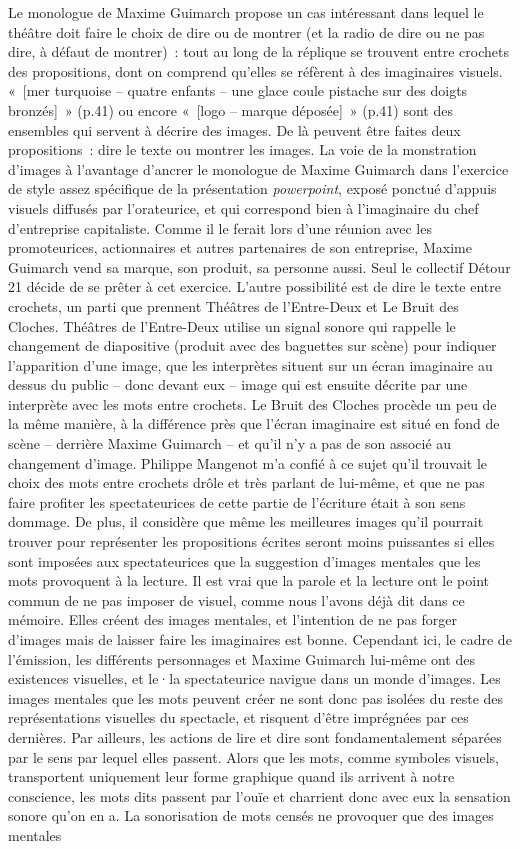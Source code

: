 \documentclass[
]{article}
\begin{document}
Le monologue de Maxime Guimarch propose un cas intéressant dans lequel le théâtre doit faire le choix de dire ou de montrer (et la radio de dire ou ne pas dire, à défaut de montrer)~: tout au long de la réplique se trouvent entre crochets des propositions, dont on comprend qu'elles se réfèrent à des imaginaires visuels. «~{[}mer turquoise -- quatre enfants -- une glace coule pistache sur des doigts bronzés{]}~» (p.41) ou encore «~{[}logo -- marque déposée{]}~» (p.41) sont des ensembles qui servent à décrire des images. De là peuvent être faites deux propositions~: dire le texte ou montrer les images. La voie de la monstration d'images à l'avantage d'ancrer le monologue de Maxime Guimarch dans l'exercice de style assez spécifique de la présentation \emph{powerpoint}, exposé ponctué d'appuis visuels diffusés par l'orateurice, et qui correspond bien à l'imaginaire du chef d'entreprise capitaliste. Comme il le ferait lors d'une réunion avec les promoteurices, actionnaires et autres partenaires de son entreprise, Maxime Guimarch vend sa marque, son produit, sa personne aussi. Seul le collectif Détour 21 décide de se prêter à cet exercice. L'autre possibilité est de dire le texte entre crochets, un parti que prennent Théâtres de l'Entre-Deux et Le Bruit des Cloches. Théâtres de l'Entre-Deux utilise un signal sonore qui rappelle le changement de diapositive (produit avec des baguettes sur scène) pour indiquer l'apparition d'une image, que les interprètes situent sur un écran imaginaire au dessus du public -- donc devant eux -- image qui est ensuite décrite par une interprète avec les mots entre crochets. Le Bruit des Cloches procède un peu de la même manière, à la différence près que l'écran imaginaire est situé en fond de scène -- derrière Maxime Guimarch -- et qu'il n'y a pas de son associé au changement d'image. Philippe Mangenot m'a confié à ce sujet qu'il trouvait le choix des mots entre crochets drôle et très parlant de lui-même, et que ne pas faire profiter les spectateurices de cette partie de l'écriture était à son sens dommage. De plus, il considère que même les meilleures images qu'il pourrait trouver pour représenter les propositions écrites seront moins puissantes si elles sont imposées aux spectateurices que la suggestion d'images mentales que les mots provoquent à la lecture. Il est vrai que la parole et la lecture ont le point commun de ne pas imposer de visuel, comme nous l'avons déjà dit dans ce mémoire. Elles créent des images mentales, et l'intention de ne pas forger d'images mais de laisser faire les imaginaires est bonne. Cependant ici, le cadre de l'émission, les différents personnages et Maxime Guimarch lui-même ont des existences visuelles, et le·la spectateurice navigue dans un monde d'images. Les images mentales que les mots peuvent créer ne sont donc pas isolées du reste des représentations visuelles du spectacle, et risquent d'être imprégnées par ces dernières. Par ailleurs, les actions de lire et dire sont fondamentalement séparées par le sens par lequel elles passent. Alors que les mots, comme symboles visuels, transportent uniquement leur forme graphique quand ils arrivent à notre conscience, les mots dits passent par l'ouïe et charrient donc avec eux la sensation sonore qu'on en a. La sonorisation de mots censés ne provoquer que des images mentales 
\end{document}
